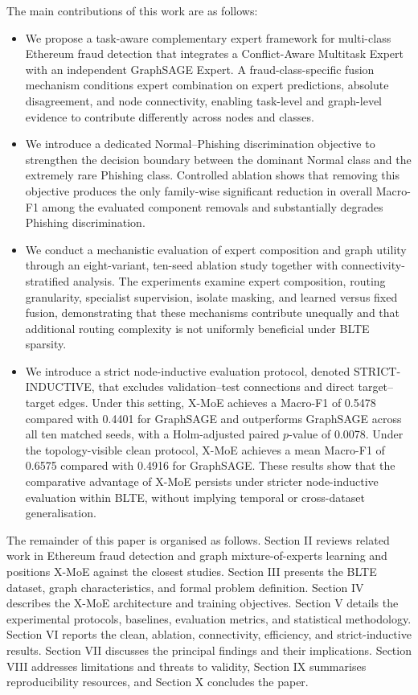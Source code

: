 \documentclass{ieeeaccess}
\begin{document}
The main contributions of this work are as follows:
\begin{itemize}

    \item We propose a task-aware complementary expert framework for multi-class Ethereum fraud detection that integrates a Conflict-Aware Multitask Expert with an independent GraphSAGE Expert. A fraud-class-specific fusion mechanism conditions expert combination on expert predictions, absolute disagreement, and node connectivity, enabling task-level and graph-level evidence to contribute differently across nodes and classes.

    \item We introduce a dedicated Normal--Phishing discrimination objective to strengthen the decision boundary between the dominant Normal class and the extremely rare Phishing class. Controlled ablation shows that removing this objective produces the only family-wise significant reduction in overall Macro-F1 among the evaluated component removals and substantially degrades Phishing discrimination.

    \item We conduct a mechanistic evaluation of expert composition and graph utility through an eight-variant, ten-seed ablation study together with connectivity-stratified analysis. The experiments examine expert composition, routing granularity, specialist supervision, isolate masking, and learned versus fixed fusion, demonstrating that these mechanisms contribute unequally and that additional routing complexity is not uniformly beneficial under BLTE sparsity.

    \item We introduce a strict node-inductive evaluation protocol, denoted STRICT-INDUCTIVE, that excludes validation--test connections and direct target--target edges. Under this setting, X-MoE achieves a Macro-F1 of 0.5478 compared with 0.4401 for GraphSAGE and outperforms GraphSAGE across all ten matched seeds, with a Holm-adjusted paired \(p\)-value of 0.0078. Under the topology-visible clean protocol, X-MoE achieves a mean Macro-F1 of 0.6575 compared with 0.4916 for GraphSAGE. These results show that the comparative advantage of X-MoE persists under stricter node-inductive evaluation within BLTE, without implying temporal or cross-dataset generalisation.

\end{itemize}

The remainder of this paper is organised as follows. Section II reviews related work in Ethereum fraud detection and graph mixture-of-experts learning and positions X-MoE against the closest studies. Section III presents the BLTE dataset, graph characteristics, and formal problem definition. Section IV describes the X-MoE architecture and training objectives. Section V details the experimental protocols, baselines, evaluation metrics, and statistical methodology. Section VI reports the clean, ablation, connectivity, efficiency, and strict-inductive results. Section VII discusses the principal findings and their implications. Section VIII addresses limitations and threats to validity, Section IX summarises reproducibility resources, and Section X concludes the paper.
\end{document}

